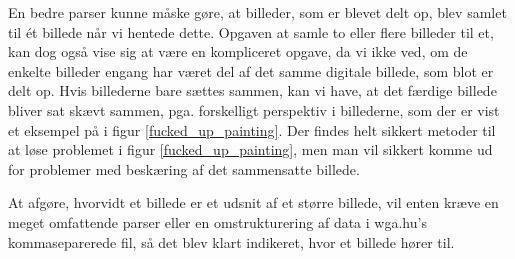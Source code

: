 {En bedre parser kunne måske gøre, at billeder, som er blevet delt op,
blev samlet til ét billede når vi hentede dette. Opgaven at samle to
eller flere billeder til et, kan dog også vise sig at være en
kompliceret opgave, da vi ikke ved, om de enkelte billeder engang har
været del af det samme digitale billede, som blot er delt op. Hvis
billederne bare sættes sammen, kan vi have, at det færdige billede
bliver sat skævt sammen, pga. forskelligt perspektiv i billederne, som
der er vist et eksempel på i figur \ref{fucked_up_painting}. Der findes
helt sikkert metoder til at løse problemet i figur
\ref{fucked_up_painting}, men man vil sikkert komme ud for problemer med
beskæring af det sammensatte billede.

At afgøre, hvorvidt et billede er et udsnit af et større billede, vil
enten kræve en meget omfattende parser eller en omstrukturering af data
i wga.hu's kommaseparerede fil, så det blev klart indikeret, hvor et
billede hører til.

}

